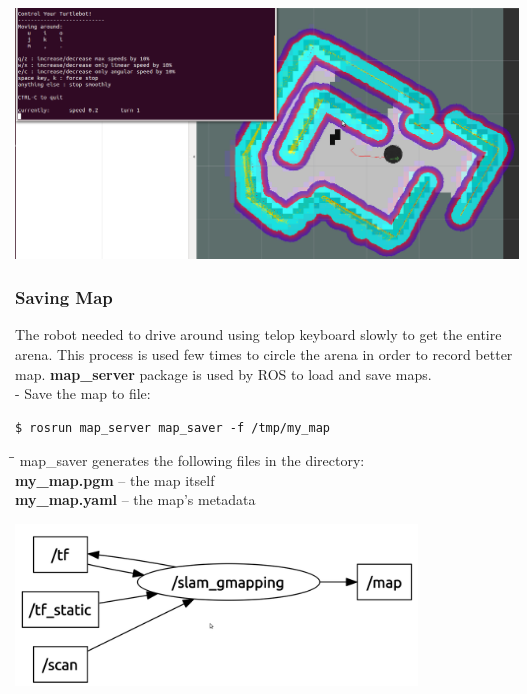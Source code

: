 \documentclass[10pt,a4paper]{article}
\begin{document}
\begin{center}
\includegraphics[width=\textwidth]{images/BuildingMap+keyboard.png}
\end{center}

\subsubsection{Saving Map}

The robot needed to drive around using telop keyboard slowly to get the entire arena. This process is used few times to circle the arena in order to record better map. \textbf{map\_server} package is used by ROS to load and save maps. \\

- Save the map to file:
\begin{lstlisting}[frame=single] 
$ rosrun map_server map_saver -f /tmp/my_map
\end{lstlisting}

\begin{tabbing}
\hspace{1cm}\=\hspace{1cm}\=\kill
map\_saver generates the following files in the directory:\\
\> \textbf{my\_map.pgm} – the map itself \\
\> \textbf{my\_map.yaml} – the map’s metadata \\
\end{tabbing}

\begin{center}
\includegraphics[width=0.8\textwidth]{images/nodes.png}
\end{center}
\end{document}
